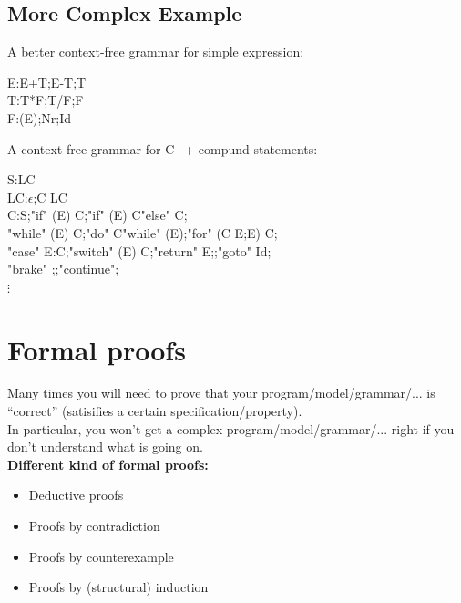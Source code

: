 \subsection{More Complex Example}
\label{sub:More Complex Example}
A better context-free grammar for simple expression:
\begin{grammar}
	E:E+T;E-T;T\\
	T:T*F;T/F;F\\
	F:(E);Nr;Id
\end{grammar}
A context-free grammar for C++ compund statements:
\begin{grammar}
	S:{LC}\\
	LC:$\epsilon$;C LC\\
	C:S;"if" (E) C;"if" (E) C"else" C;\\
	\setlength{\parindent}{20 pt}
	\indent"while" (E) C;"do" C"while" (E);"for" (C E{\escapegrammar ;}E) C;\\
	\indent"case" E{\escapegrammar :}C;"switch" (E) C;"return" E{\escapegrammar ;};"goto" Id{\escapegrammar ;}\\
	\indent"brake" {\escapegrammar ;};"continue"{\escapegrammar ;}\\
	\setlength{\parindent}{10 pt}
	\indent$\vdots$
\end{grammar}

\section{Formal proofs}
\label{sec:Formal proofs}
Many times you will need to prove that your program/model/grammar/... is
``correct'' (satisifies a certain specification/property).\\
In particular, you won't get a complex program/model/grammar/...
right if you don't understand what is going on.\\
\textbf{Different kind of formal proofs:}
\begin{itemize}
	\item Deductive proofs
	\item Proofs by contradiction
	\item Proofs by counterexample
	\item Proofs by (structural) induction
\end{itemize}

